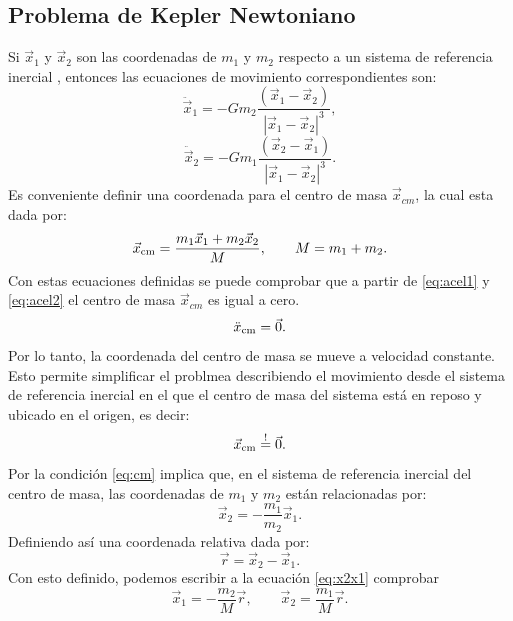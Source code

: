 \subsection{Problema de Kepler Newtoniano}
Si $\vec{x}_1$ y $\vec{x}_2$ son las coordenadas de $m_1$ y $m_2$ respecto a un sistema de referencia
inercial \cite{Wainmaier2011}, entonces las ecuaciones de movimiento correspondientes son:
\begin{equation}
\ddot{\vec{x}}_1=-Gm_2\frac{(\vec{x}_1-\vec{x}_2)}{|\vec{x}_1-\vec{x}_2|^3} ,\label{eq:acel1}
\end{equation}
\begin{equation}
\ddot{\vec{x}}_2=-Gm_1\frac{(\vec{x}_2-\vec{x}_1)}{|\vec{x}_1-\vec{x}_2|^3} .\label{eq:acel2}
\end{equation}
Es conveniente definir una coordenada para el centro de masa $\vec{x}_{cm}$, la cual esta dada por:
\begin{equation}
\vec{x}_{\rm cm}=\frac{m_1\vec{x}_1+m_2\vec{x}_2}{M}, \qquad M=m_1+m_2.
\end{equation}
Con estas ecuaciones definidas se puede comprobar que a partir de \ref{eq:acel1} y \ref{eq:acel2}  el centro de masa $\vec{x}_{cm}$ es igual a cero.
\begin{equation*}
    \ddot{x}_{\rm cm} = \vec{0}.
\end{equation*}
Por lo tanto, la coordenada del centro de masa se mueve a velocidad constante. Esto permite simplificar
el problmea describiendo el movimiento desde el sistema de referencia inercial en el que el centro de masa
del sistema está en reposo y ubicado en el origen, es decir:
\begin{equation}
    \vec{x}_{\rm cm}\stackrel{!}{=}\vec{0}. \label{eq:cm}
\end{equation}
Por la condición \ref{eq:cm} implica que, en el sistema de referencia inercial del centro de masa, las coordenadas
de $m_1$ y $m_2$ están relacionadas por:
\begin{equation}
    \vec{x}_2 = -\frac{m_1}{m_2} \vec{x}_1. \label{eq:x2x1}
\end{equation}
Definiendo así una coordenada relativa dada por:
\begin{equation}
    \vec{r}= \vec{x}_2 - \vec{x}_1 \label{eq:r}.
\end{equation}
Con esto definido, podemos escribir a la ecuación \ref{eq:x2x1} comprobar
\begin{equation}\label{eq:x12fr}
    \vec{x}_1=-\frac{m_2}{M}\vec{r}, \qquad \vec{x}_2=\frac{m_1}{M}\vec{r}.
\end{equation}
